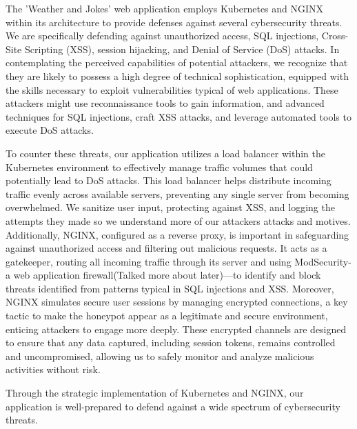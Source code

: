 The 'Weather and Jokes' web application employs Kubernetes and NGINX within its architecture to provide defenses against several cybersecurity threats. 
We are specifically defending against unauthorized access, SQL injections, Cross-Site Scripting (XSS), session hijacking, and Denial of Service (DoS) attacks. 
In contemplating the perceived capabilities of potential attackers, we recognize that they are likely to possess a high degree of technical sophistication, equipped with the skills necessary to exploit vulnerabilities typical of web applications. 
These attackers might use reconnaissance tools to gain information, and advanced techniques for SQL injections, craft XSS attacks, and leverage automated tools to execute DoS attacks.

To counter these threats, our application utilizes a load balancer within the Kubernetes environment to effectively manage traffic volumes that could potentially lead to DoS attacks. 
This load balancer helps distribute incoming traffic evenly across available servers, preventing any single server from becoming overwhelmed. We sanitize user input, protecting against XSS, and logging the attempts they made so we understand more of our attackers attacks and motives.
Additionally, NGINX, configured as a reverse proxy, is important in safeguarding against unauthorized access and filtering out malicious requests. It acts as a gatekeeper, routing all incoming traffic through its server and using ModSecurity-a web application firewall(Talked more about later)—to identify and block threats identified from patterns typical in SQL injections and XSS. 
Moreover, NGINX simulates secure user sessions by managing encrypted connections, a key tactic to make the honeypot appear as a legitimate and secure environment, enticing attackers to engage more deeply. 
These encrypted channels are designed to ensure that any data captured, including session tokens, remains controlled and uncompromised, allowing us to safely monitor and analyze malicious activities without risk.

Through the strategic implementation of Kubernetes and NGINX, our application is well-prepared to defend against a wide spectrum of cybersecurity threats.

